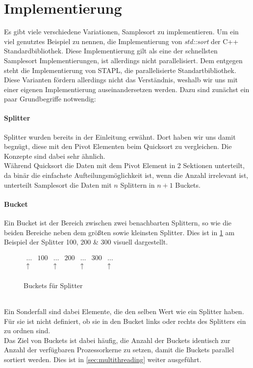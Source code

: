 \section{Implementierung}
	\label{sec:implementation}
	Es gibt viele verschiedene Variationen, Samplesort zu implementieren.
	Um ein viel genutztes Beispiel zu nennen, die Implementierung von \textit{std::sort} der C++ Standardbibliothek. \autocite{unknown-author-2019}
	Diese Implementierung gilt als eine der schnellsten Samplesort Implementierungen, ist allerdings nicht parallelisiert.
	Dem entgegen steht die Implementierung von STAPL, die parallelisierte Standartbibliothek. \autocite{berlin-2007}\\
	Diese Varianten fördern allerdings nicht das Verständnis, weshalb wir uns mit einer eigenen Implementierung auseinandersetzen werden.
	Dazu sind zunächst ein paar Grundbegriffe notwendig:
	\paragraph{Splitter}
		Splitter wurden bereits in der Einleitung erwähnt.
		Dort haben wir uns damit begnügt, diese mit den Pivot Elementen beim Quicksort zu vergleichen.
		Die Konzepte sind dabei sehr ähnlich.\\
		Während Quicksort die Daten mit dem Pivot Element in 2 Sektionen unterteilt, da binär die einfachste Aufteilungsmöglichkeit ist, wenn die Anzahl irrelevant ist, unterteilt Samplesort die Daten mit $n$ Splittern in $n+1$ Buckets.
	\paragraph{Bucket}
		Ein Bucket ist der Bereich zwischen zwei benachbarten Splittern, so wie die beiden Bereiche neben dem größten sowie kleinsten Splitter.
		Dies ist in \ref{fig:buckets-from-splitters} am Beispiel der Splitter 100, 200 \& 300 visuell dargestellt.
		\begin{figure}[h]
			\caption{Buckets für Splitter \autocite{benson-2022}}
			\label{fig:buckets-from-splitters}
			\begin{center}
				\begin{math}
					\begin{matrix}
						 \ldots  & 100 &  \ldots  & 200 &  \ldots  & 300 &  \ldots  \\
						\uparrow &     & \uparrow &     & \uparrow &     & \uparrow \\
					\end{matrix}
				\end{math}
			\end{center}
		\end{figure}\\
		Ein Sonderfall sind dabei Elemente, die den selben Wert wie ein Splitter haben.
		Für sie ist nicht definiert, ob sie in den Bucket links oder rechts des Splitters ein zu ordnen sind.\\
		Das Ziel von Buckets ist dabei häufig, die Anzahl der Buckets identisch zur Anzahl der verfügbaren Prozessorkerne zu setzen, damit die Buckets parallel sortiert werden.
		Dies ist in \ref{sec:multithreading} weiter ausgeführt.

